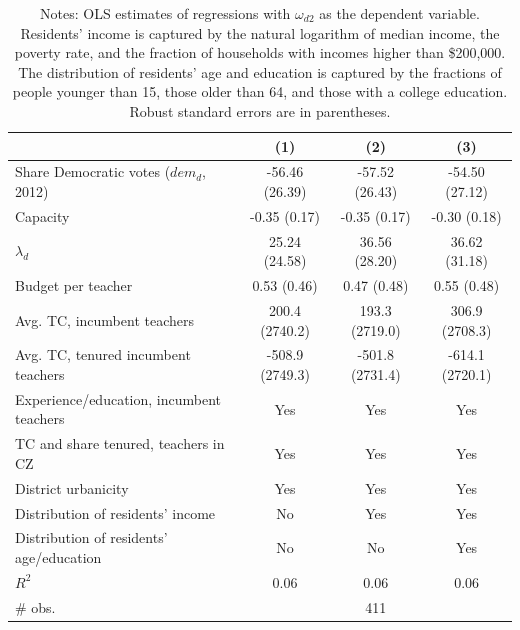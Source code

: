 \documentclass[notitlepage,12pt]{article}%
\begin{document}
\begin{table}[ptb]
\caption{Explaining District Reward for Teacher Contribution $\omega_{d2}$
(2014)}
\centering
\begin{tabular}{@{}
    l
    c @{\hspace{1.5em}\extracolsep{\fill}}
    c @{\hspace{1.5em}\extracolsep{\fill}}
    c
@{}}
\hline\hline
& (1) & (2) & (3) \\
\hline
Share Democratic votes ($dem_{d}$, 2012)
& -56.46 (26.39)
& -57.52 (26.43)
& -54.50 (27.12) \\

Capacity
& -0.35 (0.17)
& -0.35 (0.17)
& -0.30 (0.18) \\

$\lambda_{d}$
& 25.24 (24.58)
& 36.56 (28.20)
& 36.62 (31.18) \\

Budget per teacher
& 0.53 (0.46)
& 0.47 (0.48)
& 0.55 (0.48) \\

Avg. TC, incumbent teachers
& 200.4 (2740.2)
& 193.3 (2719.0)
& 306.9 (2708.3) \\

Avg. TC, tenured incumbent teachers
& -508.9 (2749.3)
& -501.8 (2731.4)
& -614.1 (2720.1) \\

Experience/education, incumbent teachers
& Yes & Yes & Yes \\

TC and share tenured, teachers in CZ
& Yes & Yes & Yes \\

District urbanicity
& Yes & Yes & Yes \\

Distribution of residents' income
& No & Yes & Yes \\

Distribution of residents' age/education
& No & No & Yes \\
\hline
$R^{2}$
& 0.06 & 0.06 & 0.06 \\

\# obs.
& \multicolumn{3}{c}{411} \\
\hline\hline
\end{tabular}
\setlength{\tabcolsep}{6pt}

\caption*{ \footnotesize{Notes: OLS estimates of regressions with
$\omega_{d2}$ as the dependent variable. Residents' income is captured by the
natural logarithm of median income, the poverty rate, and the fraction of
households with incomes higher than \$200,000. The distribution of residents'
age and education is captured by the fractions of people younger than 15,
those older than 64, and those with a college education. Robust standard
errors are in parentheses.}}
\vspace{-0.7cm}
\end{table}
\end{document}
